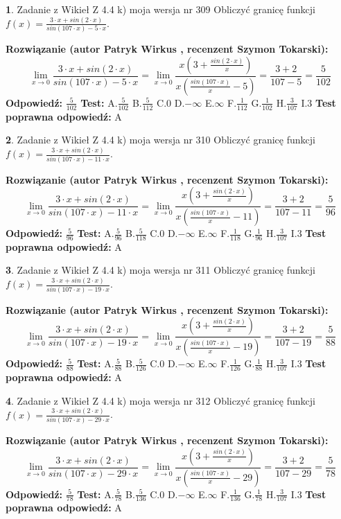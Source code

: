 \documentclass[12pt, a4paper]{article}
\theoremstyle{definition} %
\newtheorem{zad}{}
\newcommand{\zadStart}[1]{\begin{zad}#1\newline}
\newcommand{\zadStop}{\end{zad}}
\newcommand{\rozwStart}[2]{\noindent \textbf{Rozwiązanie (autor #1 , recenzent #2): }\newline}
\newcommand{\rozwStop}{\newline}
\newcommand{\odpStart}{\noindent \textbf{Odpowiedź:}\newline}
\newcommand{\odpStop}{\newline}
\newcommand{\testStart}{\noindent \textbf{Test:}\newline}
\newcommand{\testStop}{\newline}
\newcommand{\kluczStart}{\noindent \textbf{Test poprawna odpowiedź:}\newline}
\newcommand{\kluczStop}{\newline}
\begin{document}
\zadStart{Zadanie z Wikieł Z 4.4 k) moja wersja nr 309}
Obliczyć granicę funkcji $f(x)=\frac{3\cdot x +sin(2\cdot x)}{sin(107\cdot x) -5\cdot x}$.
\zadStop
\rozwStart{Patryk Wirkus}{Szymon Tokarski}
$$\lim\limits_{x\to 0}\frac{3\cdot x +sin(2\cdot x)}{sin(107\cdot x) -5\cdot x}
=\lim\limits_{x\to 0}\frac{x(3+\frac{sin(2\cdot x)}{x})}{x(\frac{sin(107\cdot x)}{x}-5)}
=\frac{3+2}{107-5} = \frac{5}{102}$$
\rozwStop
\odpStart
$\frac{5}{102}$
\odpStop
\testStart
A.$\frac{5}{102}$
B.$\frac{5}{112}$
C.$0$
D.$-\infty$
E.$\infty$
F.$\frac{1}{112}$
G.$\frac{1}{102}$
H.$\frac{3}{107}$
I.$3$
\testStop
\kluczStart
A
\kluczStop



\zadStart{Zadanie z Wikieł Z 4.4 k) moja wersja nr 310}
Obliczyć granicę funkcji $f(x)=\frac{3\cdot x +sin(2\cdot x)}{sin(107\cdot x) -11\cdot x}$.
\zadStop
\rozwStart{Patryk Wirkus}{Szymon Tokarski}
$$\lim\limits_{x\to 0}\frac{3\cdot x +sin(2\cdot x)}{sin(107\cdot x) -11\cdot x}
=\lim\limits_{x\to 0}\frac{x(3+\frac{sin(2\cdot x)}{x})}{x(\frac{sin(107\cdot x)}{x}-11)}
=\frac{3+2}{107-11} = \frac{5}{96}$$
\rozwStop
\odpStart
$\frac{5}{96}$
\odpStop
\testStart
A.$\frac{5}{96}$
B.$\frac{5}{118}$
C.$0$
D.$-\infty$
E.$\infty$
F.$\frac{1}{118}$
G.$\frac{1}{96}$
H.$\frac{3}{107}$
I.$3$
\testStop
\kluczStart
A
\kluczStop



\zadStart{Zadanie z Wikieł Z 4.4 k) moja wersja nr 311}
Obliczyć granicę funkcji $f(x)=\frac{3\cdot x +sin(2\cdot x)}{sin(107\cdot x) -19\cdot x}$.
\zadStop
\rozwStart{Patryk Wirkus}{Szymon Tokarski}
$$\lim\limits_{x\to 0}\frac{3\cdot x +sin(2\cdot x)}{sin(107\cdot x) -19\cdot x}
=\lim\limits_{x\to 0}\frac{x(3+\frac{sin(2\cdot x)}{x})}{x(\frac{sin(107\cdot x)}{x}-19)}
=\frac{3+2}{107-19} = \frac{5}{88}$$
\rozwStop
\odpStart
$\frac{5}{88}$
\odpStop
\testStart
A.$\frac{5}{88}$
B.$\frac{5}{126}$
C.$0$
D.$-\infty$
E.$\infty$
F.$\frac{1}{126}$
G.$\frac{1}{88}$
H.$\frac{3}{107}$
I.$3$
\testStop
\kluczStart
A
\kluczStop



\zadStart{Zadanie z Wikieł Z 4.4 k) moja wersja nr 312}
Obliczyć granicę funkcji $f(x)=\frac{3\cdot x +sin(2\cdot x)}{sin(107\cdot x) -29\cdot x}$.
\zadStop
\rozwStart{Patryk Wirkus}{Szymon Tokarski}
$$\lim\limits_{x\to 0}\frac{3\cdot x +sin(2\cdot x)}{sin(107\cdot x) -29\cdot x}
=\lim\limits_{x\to 0}\frac{x(3+\frac{sin(2\cdot x)}{x})}{x(\frac{sin(107\cdot x)}{x}-29)}
=\frac{3+2}{107-29} = \frac{5}{78}$$
\rozwStop
\odpStart
$\frac{5}{78}$
\odpStop
\testStart
A.$\frac{5}{78}$
B.$\frac{5}{136}$
C.$0$
D.$-\infty$
E.$\infty$
F.$\frac{1}{136}$
G.$\frac{1}{78}$
H.$\frac{3}{107}$
I.$3$
\testStop
\kluczStart
A
\kluczStop
\end{document}
